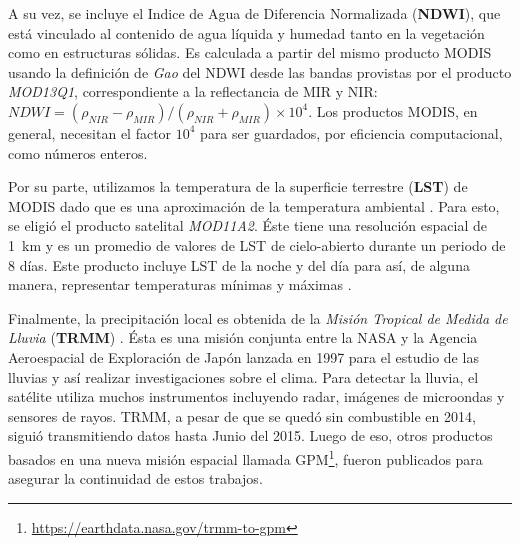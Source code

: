  \par A su vez, se incluye el Indice de Agua de Diferencia Normalizada
    (\textbf{NDWI}), que está vinculado al contenido de agua líquida y humedad
    tanto en la vegetación como en estructuras sólidas.
    Es calculada a partir del mismo producto MODIS usando la definición de
    \textit{Gao} \cite{gao_ndwi} del NDWI desde las bandas provistas por
    el producto \textit{MOD13Q1}, correspondiente a la reflectancia de MIR y NIR:
    $NDWI =  (\rho_{NIR} - \rho_{MIR}) / (\rho_{NIR}  + \rho_{MIR} ) \times 10^4$.
    Los productos MODIS, en general, necesitan el factor $10^{4}$ para ser guardados,
    por eficiencia computacional, como números enteros.

  \par Por su parte, utilizamos la temperatura de la superficie
    terrestre (\textbf{LST}) de MODIS dado que es una aproximación de la
    temperatura ambiental \cite{infectious_diseases, surface_temp, temp_algorithm}.
    Para esto, se eligió el producto satelital \textit{MOD11A2}. Éste tiene una
    resolución espacial de \SI{1}{\kilo\meter} y es un promedio de valores de
    LST de cielo-abierto durante un periodo de 8 días. Este producto incluye
    LST de la noche y del día para así, de alguna manera, representar
    temperaturas mínimas y máximas \cite{lst_surface}.

  \par Finalmente, la precipitación local es obtenida de la
    \textit{Misión Tropical de Medida de Lluvia}
    (\textbf{TRMM}) \cite{trmm_mision}. Ésta es una misión conjunta entre la
    NASA y la Agencia Aeroespacial de Exploración de Japón lanzada en 1997
    para el estudio de las lluvias y así realizar investigaciones sobre el
    clima. Para detectar la lluvia, el satélite utiliza muchos instrumentos
    incluyendo radar, imágenes de microondas y sensores de rayos. TRMM, a pesar
    de que se quedó sin combustible en 2014, siguió transmitiendo datos hasta
    Junio del 2015.
    Luego de eso, otros productos basados en una nueva misión espacial llamada
    GPM\footnote{\url{https://earthdata.nasa.gov/trmm-to-gpm}}, fueron publicados para
    asegurar la continuidad de estos trabajos.


